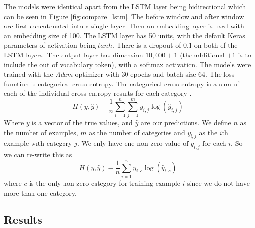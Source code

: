 \documentclass[11pt,a4paper]{article}
\begin{document}
The models were identical apart from the LSTM layer being bidirectional which can be seen in Figure \ref{fig:compare_lstm}.
The before window and after window are first concatenated into a single layer.
Then an embedding layer is used with an embedding size of 100.
The LSTM layer has 50 units, with the default Keras parameters of activation being $tanh$.
There is a dropout of $0.1$ on both of the LSTM layers.
The output layer has dimension $10,000 + 1$ (the additional $+1$ is to include the out of vocabulary token), with a softmax activation.
The models were trained with the \textit{Adam} optimizer with 30 epochs and batch size 64.
The loss function is categorical cross entropy.
The categorical cross entropy is a sum of each of the individual cross entropy results for each category \cite{wiki:crossentropy}.
$$
H(y, \hat{y}) - \frac{1}{n} \sum_{i = 1}^{n} \sum_{j = 1}^{m} y_{i,j} \log(\hat{y}_{i,j})
$$
Where $y$ is a vector of the true values, and $\hat{y}$ are our predictions.
We define $n$ as the number of examples, $m$ as the number of categories and $y_{i,j}$ as the $i$th example with category $j$.
We only have one non-zero value of $y_{i,j}$ for each $i$.
So we can re-write this as
$$
H(y, \hat{y}) - \frac{1}{n} \sum_{i = 1}^{n} y_{i,c} \log(\hat{y}_{i,c})
$$
where $c$ is the only non-zero category for training example $i$ since we do not have more than one category.

\subsection{Results}
\end{document}
